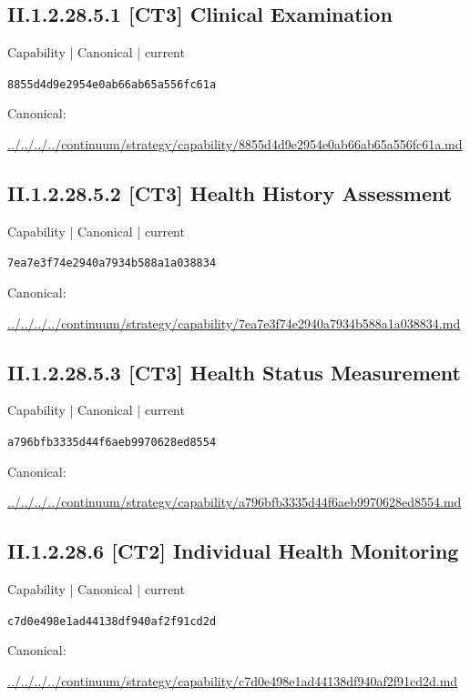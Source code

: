 \documentclass[10pt,a4paper]{article}
\begin{document}
\subsection*{II.1.2.28.5.1 [CT3] Clinical Examination}
{\small Capability | Canonical | current}\par
\texttt{8855d4d9e2954e0ab66ab65a556fc61a}\par
Canonical: \par
{\footnotesize\url{../../../../continuum/strategy/capability/8855d4d9e2954e0ab66ab65a556fc61a.md}}\par
\subsection*{II.1.2.28.5.2 [CT3] Health History Assessment}
{\small Capability | Canonical | current}\par
\texttt{7ea7e3f74e2940a7934b588a1a038834}\par
Canonical: \par
{\footnotesize\url{../../../../continuum/strategy/capability/7ea7e3f74e2940a7934b588a1a038834.md}}\par
\subsection*{II.1.2.28.5.3 [CT3] Health Status Measurement}
{\small Capability | Canonical | current}\par
\texttt{a796bfb3335d44f6aeb9970628ed8554}\par
Canonical: \par
{\footnotesize\url{../../../../continuum/strategy/capability/a796bfb3335d44f6aeb9970628ed8554.md}}\par
\subsection*{II.1.2.28.6 [CT2] Individual Health Monitoring}
{\small Capability | Canonical | current}\par
\texttt{c7d0e498e1ad44138df940af2f91cd2d}\par
Canonical: \par
{\footnotesize\url{../../../../continuum/strategy/capability/c7d0e498e1ad44138df940af2f91cd2d.md}}\par
\end{document}
